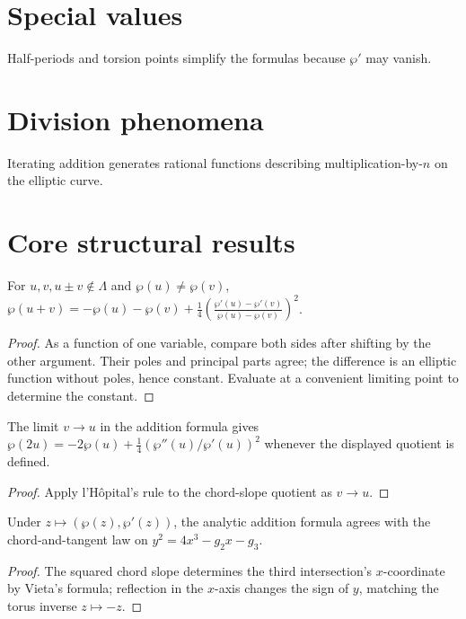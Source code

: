 \section{Special values}
Half-periods and torsion points simplify the formulas because $\wp'$ may vanish.

\section{Division phenomena}
Iterating addition generates rational functions describing multiplication-by-$n$ on the elliptic curve.

\section{Core structural results}

\begin{theorem}\label{thm:iv30-01}
For $u,v,u\pm v\notin\Lambda$ and $\wp(u)\ne\wp(v)$, $\wp(u+v)=-\wp(u)-\wp(v)+\frac14\left(\frac{\wp'(u)-\wp'(v)}{\wp(u)-\wp(v)}\right)^2$.
\begin{proof}
As a function of one variable, compare both sides after shifting by the other argument. Their poles and principal parts agree; the difference is an elliptic function without poles, hence constant. Evaluate at a convenient limiting point to determine the constant.
\end{proof}
\end{theorem}

\begin{theorem}\label{thm:iv30-02}
The limit $v\to u$ in the addition formula gives $\wp(2u)=-2\wp(u)+\frac14(\wp''(u)/\wp'(u))^2$ whenever the displayed quotient is defined.
\begin{proof}
Apply l'Hôpital's rule to the chord-slope quotient as $v\to u$.
\end{proof}
\end{theorem}

\begin{theorem}\label{thm:iv30-03}
Under $z\mapsto(\wp(z),\wp'(z))$, the analytic addition formula agrees with the chord-and-tangent law on $y^2=4x^3-g_2x-g_3$.
\begin{proof}
The squared chord slope determines the third intersection's $x$-coordinate by Vieta's formula; reflection in the $x$-axis changes the sign of $y$, matching the torus inverse $z\mapsto-z$.
\end{proof}
\end{theorem}

